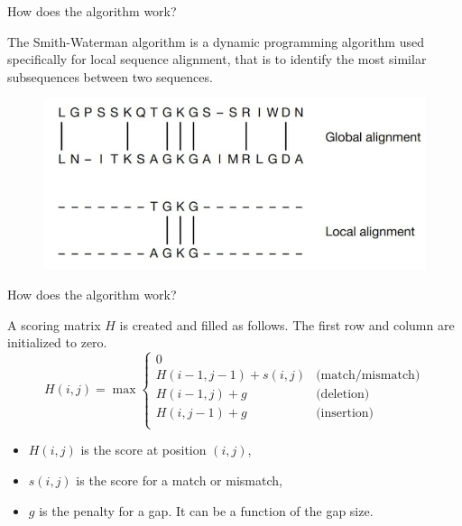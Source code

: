     \begin{frame}{How does the algorithm work?}

        The Smith-Waterman algorithm is a dynamic programming algorithm used specifically for local sequence alignment, that is to identify the most similar subsequences between two sequences.

        \vspace{20pt}

        \begin{figure}
            \centering
            \includegraphics[width=0.5\linewidth]{global_vs_local_alignment.jpg}
        \end{figure}

    \end{frame}



    \begin{frame}{How does the algorithm work?}

        A scoring matrix $H$ is created and filled as follows. The first row and column are initialized to zero.
        \[
            H(i, j) = \max \begin{cases} 
            0 \\
            H(i-1, j-1) + s(i, j) & \text{(match/mismatch)} \\
            H(i-1, j) + g & \text{(deletion)} \\
            H(i, j-1) + g & \text{(insertion)} \\
            \end{cases}
        \]

        \begin{itemize}
            \item $H(i, j)$ is the score at position $(i, j)$,
            \item $s(i, j)$ is the score for a match or mismatch,
            \item $g$ is the penalty for a gap. It can be a function of the gap size. 
        \end{itemize}
        
    \end{frame}

